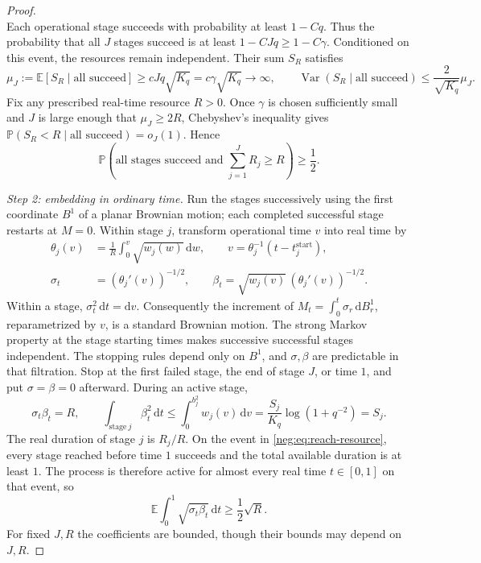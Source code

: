 \documentclass[11pt]{article}
\theoremstyle{definition}
\theoremstyle{remark}
\numberwithin{equation}{section}
\begin{document}
\begin{proof}
\begin{equation}
\end{equation}
Each operational stage succeeds with probability at least $1-Cq$.
Thus the probability that all $J$ stages succeed is at least
$1-CJq\ge1-C\gamma$. Conditioned on this event, the resources
remain independent. Their sum $S_R$ satisfies
\[
 \mu_J:=\mathbb E[S_R\mid\text{all succeed}]
       \ge cJq\sqrt{K_q}=c\gamma\sqrt{K_q}\longrightarrow\infty,
 \qquad
 \operatorname{Var}(S_R\mid\text{all succeed})
       \le\frac{2}{\sqrt{K_q}}\mu_J.
\]
Fix any prescribed real-time resource $R>0$. Once $\gamma$ is chosen
sufficiently small and $J$ is large enough that $\mu_J\ge2R$,
Chebyshev's inequality gives
$\mathbb P(S_R<R\mid\text{all succeed})=o_J(1)$. Hence
\begin{equation}\label{neg:eq:reach-resource}
 \mathbb P\left(\text{all stages succeed and }
                   \sum_{j=1}^J R_j\ge R\right)\ge\frac12.
\end{equation}

\emph{Step 2: embedding in ordinary time.}
Run the stages successively using the first coordinate $B^1$ of a
planar Brownian motion; each completed successful stage restarts at
$M=0$. Within stage $j$, transform operational time $v$ into real time
by
\begin{equation}\label{neg:eq:clock}
 \begin{aligned}
  \theta_j(v)&=\frac1R\int_0^v\sqrt{w_j(w)}\,\mathrm dw,
  \qquad v=\theta_j^{-1}(t-t_j^{\mathrm{start}}),\\
  \sigma_t&=(\theta_j'(v))^{-1/2},
  \qquad\beta_t=\sqrt{w_j(v)}\,(\theta_j'(v))^{-1/2}.
 \end{aligned}
\end{equation}
Within a stage, $\sigma_t^2\,\mathrm dt=\mathrm dv$.
Consequently the increment of $M_t=\int_0^t\sigma_r\,\mathrm dB_r^1$,
reparametrized by $v$, is a standard Brownian motion. The strong
Markov property at the stage starting times makes successive
successful stages independent. The stopping rules depend only on
$B^1$, and $\sigma,\beta$ are predictable in that filtration.
Stop at the first failed stage, the end of stage $J$, or time $1$, and
put $\sigma=\beta=0$ afterward. During an active stage,
\begin{equation}\label{neg:eq:clock-identities}
  \sigma_t\beta_t=R,
  \qquad \int_{\mathrm{stage}\ j}\beta_t^2\,\mathrm dt
       \le\int_0^{b_j^2}w_j(v)\,\mathrm dv
       =\frac{S_j}{K_q}\log(1+q^{-2})=S_j.
\end{equation}
The real duration of stage $j$ is $R_j/R$. On the event in
\eqref{neg:eq:reach-resource}, every stage reached before time $1$
succeeds and the total available duration is at least $1$.
The process is therefore active for almost every real time
$t\in[0,1]$ on that event, so
\begin{equation}\label{neg:eq:sigbeta-gain}
 \mathbb E\int_0^1\sqrt{\sigma_t\beta_t}\,\mathrm dt
     \ge\frac12\sqrt R.
\end{equation}
For fixed $J,R$ the coefficients are bounded, though their bounds may
depend on $J,R$.


\end{proof}
\end{document}
